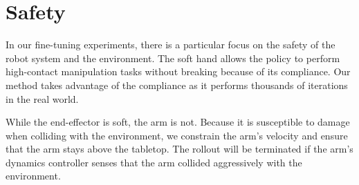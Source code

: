\section{Safety} 

In our fine-tuning experiments, there is a particular focus on the safety of the robot system and the environment. The soft hand allows the policy to perform high-contact manipulation tasks without breaking because of its compliance. Our method takes advantage of the compliance as it performs thousands of iterations in the real world.

While the end-effector is soft, the arm is not. Because it is susceptible to damage when colliding with the environment, we constrain the arm's velocity and ensure that the arm stays above the tabletop. The rollout will be terminated if the arm's dynamics controller senses that the arm collided aggressively with the environment.
 